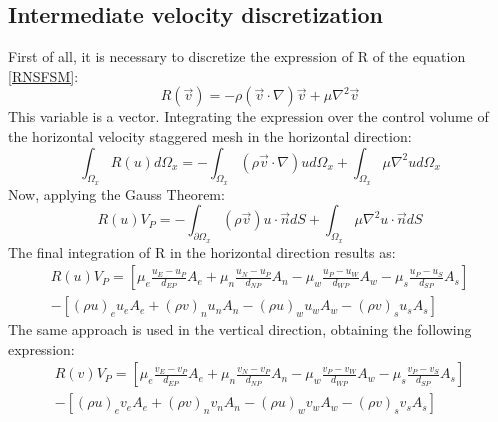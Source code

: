 \subsection{Intermediate velocity discretization}
First of all, it is necessary to discretize the expression of R of the equation \ref{RNSFSM}:
\begin{equation}
R\left(\vec{v}\right)=-\rho\left(\vec{v}\cdot\nabla\right)\vec{v}+\mu\nabla^{2}\vec{v}
\end{equation}
This variable is a vector. Integrating the expression over the control volume of the horizontal velocity staggered mesh in the horizontal direction:
\begin{equation}
\int_{\Omega_{x}}R\left(u\right)d\Omega_{x}=-\int_{\Omega_{x}}\left(\rho\vec{v}\cdot\nabla\right)ud\Omega_{x}+\int_{\Omega_{x}}\mu\nabla^{2}ud\Omega_{x}
\end{equation}
Now, applying the Gauss Theorem:
\begin{equation}
R\left(u\right)V_{P}=-\int_{\partial\Omega_{x}}\left(\rho\vec{v}\right)u\cdot\vec{n}dS+\int_{\Omega_{x}}\mu\nabla^{2}u\cdot\vec{n}dS
\end{equation}
The final integration of R in the horizontal direction results as:
\begin{multline}
R\left(u\right)V_{P}=\left[\mu_{e}\frac{u_{E}-u_{P}}{d_{EP}}A_{e}+\mu_{n}\frac{u_{N}-u_{P}}{d_{NP}}A_{n}-\mu_{w}\frac{u_{P}-u_{W}}{d_{WP}}A_{w}-\mu_{s}\frac{u_{P}-u_{S}}{d_{SP}}A_{s}\right] \\
-\left[\left(\rho u\right)_{e}u_{e}A_{e}+\left(\rho v\right)_{n}u_{n}A_{n}-\left(\rho u\right)_{w}u_{w}A_{w}-\left(\rho v\right)_{s}u_{s}A_{s}\right]
\end{multline}
The same approach is used in the vertical direction, obtaining the following expression:
\begin{multline}
	R\left(v\right)V_{P}=\left[\mu_{e}\frac{v_{E}-v_{P}}{d_{EP}}A_{e}+\mu_{n}\frac{v_{N}-v_{P}}{d_{NP}}A_{n}-\mu_{w}\frac{v_{P}-v_{W}}{d_{WP}}A_{w}-\mu_{s}\frac{v_{P}-v_{S}}{d_{SP}}A_{s}\right] \\
	-\left[\left(\rho u\right)_{e}v_{e}A_{e}+\left(\rho v\right)_{n}v_{n}A_{n}-\left(\rho u\right)_{w}v_{w}A_{w}-\left(\rho v\right)_{s}v_{s}A_{s}\right]
\end{multline}

